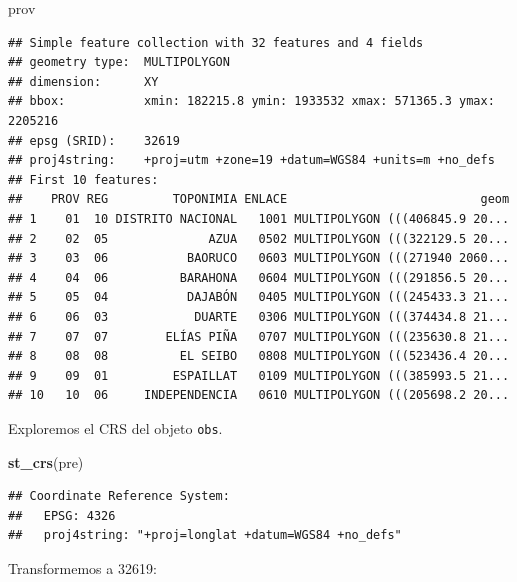 \documentclass[11pt,]{article}
\newenvironment{Shaded}{\begin{snugshade}}{\end{snugshade}}
\newcommand{\KeywordTok}[1]{\textcolor[rgb]{0.13,0.29,0.53}{\textbf{#1}}}
\newcommand{\DataTypeTok}[1]{\textcolor[rgb]{0.13,0.29,0.53}{#1}}
\newcommand{\DecValTok}[1]{\textcolor[rgb]{0.00,0.00,0.81}{#1}}
\newcommand{\StringTok}[1]{\textcolor[rgb]{0.31,0.60,0.02}{#1}}
\newcommand{\OperatorTok}[1]{\textcolor[rgb]{0.81,0.36,0.00}{\textbf{#1}}}
\newcommand{\NormalTok}[1]{#1}
\begin{document}
\begin{Shaded}
\begin{Highlighting}[]
\NormalTok{prov}
\end{Highlighting}
\end{Shaded}

\begin{verbatim}
## Simple feature collection with 32 features and 4 fields
## geometry type:  MULTIPOLYGON
## dimension:      XY
## bbox:           xmin: 182215.8 ymin: 1933532 xmax: 571365.3 ymax: 2205216
## epsg (SRID):    32619
## proj4string:    +proj=utm +zone=19 +datum=WGS84 +units=m +no_defs
## First 10 features:
##    PROV REG         TOPONIMIA ENLACE                           geom
## 1    01  10 DISTRITO NACIONAL   1001 MULTIPOLYGON (((406845.9 20...
## 2    02  05              AZUA   0502 MULTIPOLYGON (((322129.5 20...
## 3    03  06           BAORUCO   0603 MULTIPOLYGON (((271940 2060...
## 4    04  06          BARAHONA   0604 MULTIPOLYGON (((291856.5 20...
## 5    05  04           DAJABÓN   0405 MULTIPOLYGON (((245433.3 21...
## 6    06  03            DUARTE   0306 MULTIPOLYGON (((374434.8 21...
## 7    07  07        ELÍAS PIÑA   0707 MULTIPOLYGON (((235630.8 21...
## 8    08  08          EL SEIBO   0808 MULTIPOLYGON (((523436.4 20...
## 9    09  01         ESPAILLAT   0109 MULTIPOLYGON (((385993.5 21...
## 10   10  06     INDEPENDENCIA   0610 MULTIPOLYGON (((205698.2 20...
\end{verbatim}

Exploremos el CRS del objeto \texttt{obs}.

\begin{Shaded}
\begin{Highlighting}[]
\KeywordTok{st_crs}\NormalTok{(pre)}
\end{Highlighting}
\end{Shaded}

\begin{verbatim}
## Coordinate Reference System:
##   EPSG: 4326 
##   proj4string: "+proj=longlat +datum=WGS84 +no_defs"
\end{verbatim}

Transformemos a 32619:

\begin{Shaded}
\end{Shaded}
\end{document}

